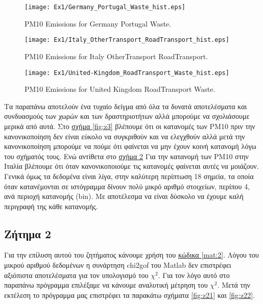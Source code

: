 \documentclass[11pt]{scrartcl} %
\begin{document}
\begin{figure}[H]

	\centering
	\texttt{[image: Ex1/Germany\_Portugal\_Waste\_hist.eps]}	
\caption{PM10 Emissions for Germany Portugal Waste.}
\label{fig:z4} 
\end{figure}


\begin{figure}[H] 

	\centering
	\texttt{[image: Ex1/Italy\_OtherTransport\_RoadTransport\_hist.eps]}	
	\caption{PM10 Emissions for Italy OtherTransport RoadTransport.}
		\label{fig:z5}
\end{figure}

\begin{figure}[H]

	\centering
	\texttt{[image: Ex1/United-Kingdom\_RoadTransport\_Waste\_hist.eps]}	
\caption{PM10 Emissions for United Kingdom RoadTransport Waste.}
\label{fig:z6} 
\end{figure}


Τα παραπάνω αποτελούν ένα τυχαίο δείγμα από όλα τα δυνατά αποτελέσματα και συνδυασμούς των χωρών και των δραστηριοτήτων αλλά μπορούμε να σχολιάσουμε μερικά από αυτά. Στο \hyperref[fig:z3]{σχήμα \ref*{fig:z3}} βλέπουμε ότι οι κατανομές των PM10 πριν την κανονικοποίηση δεν είναι εύκολο να συγκριθούν και να ελεγχθούν αλλά μετά την κανονικοποίηση μπορούμε να πούμε ότι φαίνεται να μην έχουν κοινή κατανομή λόγω του σχήματός τους. Ενώ αντίθετα στο \hyperref[fig:z5]{σχήμα \ref*{fig:z5}} Για την κατανομή των PM10 στην Ιταλία βλέπουμε ότι όταν κανονικοποιούμε τις κατανομές φαίνεται αυτές να μοιάζουν. Γενικά όμως τα δεδομένα είναι λίγα, στην καλύτερη περίπτωση 18 σημεία, τα οποία όταν κατανέμονται σε ιστόγραμμα δίνουν πολύ μικρό αριθμό στοιχείων, περίπου 4, ανά περιοχή κατανομής (bin). Με αποτέλεσμα να είναι δύσκολο να έχουμε καλή περιγραφή της κάθε κατανομής. 

\subsection{Ζήτημα 2}
\label{subsec:z2}
Για την επίλυση αυτού του ζητήματος κάνουμε χρήση του \hyperref[mat:2]{κώδικα \ref*{mat:2}}. Λόγου του μικρού αριθμού δεδομένων η συνάρτηση chi2gof του Matlab δεν επιστρέφει αξιόπιστα αποτελέσματα για τον υπολογισμό του $\chi^{2}$. Για τον λόγο αυτό στο παραπάνω πρόγραμμα επιλέξαμε να κάνουμε αναλυτική μέτρηση του $\chi^{2}$. Μετά την εκτέλεση το πρόγραμμα μας επιστρέφει τα παρακάτω σχήματα \ref{fig:z21} και \ref{fig:z22}.
\end{document}
